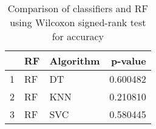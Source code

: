 \begin{table}
\footnotesize
\caption{Comparison of classifiers and RF using Wilcoxon signed-rank test for accuracy}
\label{tab:RF wilcoxon ACC comparison}
\begin{tabular}{lllr}
\hline
 & RF & Algorithm & p-value \\
\hline
1 & RF & DT & 0.600482 \\
2 & RF & KNN & 0.210810 \\
3 & RF & SVC & 0.580445 \\
\hline
\end{tabular}
\end{table}
